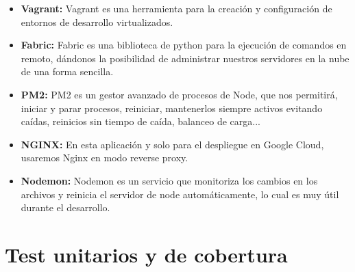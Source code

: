 \begin{itemize}
  \item \textbf{Vagrant:} Vagrant es una herramienta para la creación y configuración de entornos de desarrollo virtualizados.
  
  \item \textbf{Fabric: }Fabric es una biblioteca de python para la ejecución de comandos en remoto, dándonos la posibilidad de administrar nuestros servidores en la nube de una forma sencilla.
  
  \item \textbf{PM2:} PM2 es un gestor avanzado de procesos de Node, que nos permitirá, iniciar y parar procesos, reiniciar, mantenerlos siempre activos evitando caídas, reinicios sin tiempo de caída, balanceo de carga...
  
  \item \textbf{NGINX:} En esta aplicación y solo para el despliegue en Google Cloud, usaremos Nginx en modo reverse proxy.
  
  \item \textbf{Nodemon:} Nodemon es un servicio que monitoriza los cambios en los archivos y reinicia el servidor de node automáticamente, lo cual es muy útil durante el desarrollo.

\end{itemize}
\section {Test unitarios y de cobertura}
